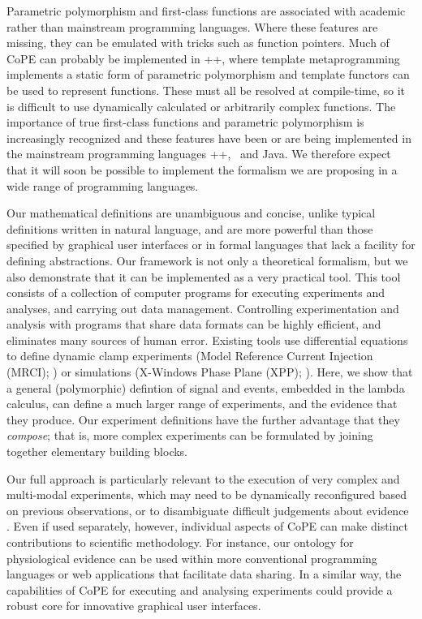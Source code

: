 Parametric polymorphism and first-class functions are associated with
academic rather than mainstream programming languages. Where these
features are missing, they can be emulated with tricks such as
function pointers. Much of CoPE can probably be implemented in \C++,
where template metaprogramming implements a static form of parametric
polymorphism and template functors can be used to represent
functions. These must all be resolved at compile-time, so it is
difficult to use dynamically calculated or arbitrarily complex
functions. The importance of true first-class functions and parametric
polymorphism is increasingly recognized and these features have been
or are being implemented in the mainstream programming languages \C++, \Csharp\, and
Java. We therefore expect that it will soon be possible to
implement the formalism we are proposing in a wide range of
programming languages.

%
% 
%
Our mathematical definitions are unambiguous and concise, unlike
typical definitions written in natural language, and are more powerful
than those specified by graphical user interfaces or in formal
languages that lack a facility for defining abstractions. Our
framework is not only a theoretical formalism, but we also demonstrate
that it can be implemented as a very practical tool. This tool
consists of a collection of computer programs for executing
experiments and analyses, and carrying out data
management. Controlling experimentation and analysis with programs
that share data formats can be highly efficient, and eliminates many
sources of human error. Existing tools use differential equations to
define dynamic clamp experiments (Model Reference Current Injection
(MRCI); \citep{Raikov2004}) or simulations (X-Windows Phase Plane
(XPP); \citep{Ermentrout1987}). Here, we show that a general
(polymorphic) defintion of signal and events, embedded in the lambda
calculus, can define a much larger range of experiments, and the
evidence that they produce. Our experiment definitions have the
further advantage that they \emph{compose}; that is, more complex
experiments can be formulated by joining together elementary building
blocks.


Our full approach is particularly relevant to the execution of very
complex and multi-modal experiments, which may need to be dynamically
reconfigured based on previous observations, or to disambiguate
difficult judgements about evidence \citep{Kriegeskorte2009}. Even
if used separately, however, individual aspects of CoPE can make
distinct contributions to scientific methodology. For instance, our
ontology for physiological evidence can be used within more
conventional programming languages or web applications that facilitate
data sharing. In a similar way, the capabilities of CoPE for executing
and analysing experiments could provide a robust core for innovative
graphical user interfaces.


